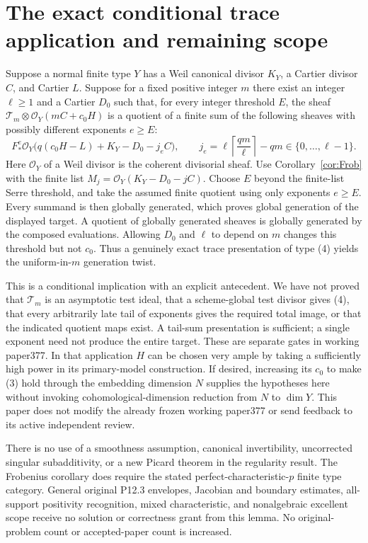 \documentclass[11pt]{article}
\newcommand{\OO}{\mathcal O}
\begin{document}
\section{The exact conditional trace application and remaining scope}
Suppose a normal finite type $Y$ has a Weil canonical divisor $K_Y$,
a Cartier divisor $C$, and Cartier $L$. Suppose for a fixed positive
integer $m$ there exist an integer $\ell\geq1$ and a Cartier $D_0$
such that, for every integer threshold $E$, the sheaf
$\mathcal T_m\otimes\OO_Y(mC+c_0H)$ is a quotient of a finite sum of
the following sheaves with possibly different exponents $e\geq E$:
\[
 F_*^e\OO_Y\bigl(q(c_0H-L)+K_Y-D_0-j_eC\bigr),\qquad
 j_e=\ell\left\lceil\frac{qm}{\ell}\right\rceil-qm
       \in\{0,\ldots,\ell-1\}.                            \tag{4}
\]
Here $\OO_Y$ of a Weil divisor is the coherent divisorial sheaf.
Use Corollary~\ref{cor:Frob} with the finite list
$M_j=\OO_Y(K_Y-D_0-jC)$. Choose $E$ beyond the finite-list Serre
threshold, and take the assumed finite quotient using only exponents
$e\geq E$. Every summand is then globally generated, which proves
global generation of
the displayed target. A quotient of globally generated sheaves is
globally generated by the composed evaluations. Allowing $D_0$ and
$\ell$ to depend on $m$ changes this threshold but not $c_0$.
Thus a genuinely exact trace presentation of type (4) yields the
uniform-in-$m$ generation twist.

This is a conditional implication with an explicit antecedent. We have
not proved that $\mathcal T_m$ is an asymptotic test ideal, that a
scheme-global test divisor gives (4), that every arbitrarily late tail
of exponents gives the required total image, or that the indicated
quotient maps exist. A tail-sum presentation is sufficient; a single
exponent need not produce the entire target.
These are separate gates in working paper377. In that application $H$
can be chosen very ample by taking a sufficiently high power in its
primary-model construction. If desired, increasing its $c_0$ to make
(3) hold through the embedding dimension $N$ supplies the hypotheses
here without invoking cohomological-dimension reduction from $N$ to
$\dim Y$. This paper does not modify the already frozen working
paper377 or send feedback to its active independent review.

There is no use of a smoothness assumption, canonical invertibility,
uncorrected singular subadditivity, or a new Picard theorem in the
regularity result. The Frobenius corollary does require the stated
perfect-characteristic-$p$ finite type category. General original
P12.3 envelopes, Jacobian and boundary estimates, all-support positivity
recognition, mixed characteristic, and nonalgebraic excellent scope
receive no solution or correctness grant from this lemma.
No original-problem count or accepted-paper count is increased.
\end{document}
